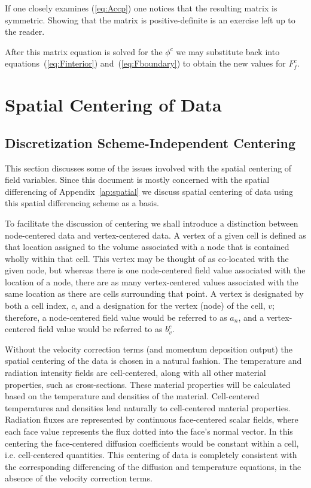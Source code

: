 \documentclass[12pt]{article}
\begin{document}
If one closely examines (\ref{eq:Accp}) one notices that the resulting
matrix is symmetric.  Showing that the matrix is positive-definite is
an exercise left up to the reader.

After this matrix equation is solved for the $\phi^{c}$ we may substitute
back into equations~(\ref{eq:Finterior}) and~(\ref{eq:Fboundary})
to obtain the new values for $F^{c}_{f}$.

\section{Spatial Centering of Data}

\subsection{Discretization Scheme-Independent Centering}

This section discusses some of the issues involved with the spatial
centering of field variables.
Since this document is mostly concerned with the spatial differencing of
Appendix~\ref{ap:spatial} we discuss spatial centering of data using
this spatial differencing scheme as a basis.

To facilitate the discussion of centering we shall introduce a distinction
between node-centered data and vertex-centered data.
A vertex of a given cell
is defined as that location assigned to the volume associated with
a node that is contained wholly within that cell.
This vertex may be thought of as co-located with the given node, but
whereas there is one node-centered field
value associated with the location of a node, there are as
many vertex-centered values associated with the same location as
there are cells surrounding that point.
A vertex is designated by both a cell index, $c$, and a designation
for the vertex (node) of the cell, $v$; therefore, a node-centered field value
would be referred to as $a_{n}$, and a vertex-centered field value
would be referred to as $b^{c}_{v}$.

Without the velocity correction terms (and momentum deposition output)
the spatial centering of the data is chosen in a natural fashion.
The temperature and radiation intensity fields are cell-centered,
along with all other material properties, such as cross-sections.
These material properties will be calculated based on the temperature
and densities of the material.
Cell-centered temperatures and densities lead naturally to cell-centered
material properties.
Radiation fluxes are represented by continuous face-centered scalar fields,
where each face value represents the flux dotted into the face's normal
vector.
In this centering the face-centered diffusion coefficients would be constant
within a cell, i.e. cell-centered quantities.
This centering of data is completely consistent with the
corresponding differencing of the diffusion and temperature equations,
in the absence of the velocity correction terms.
\end{document}
